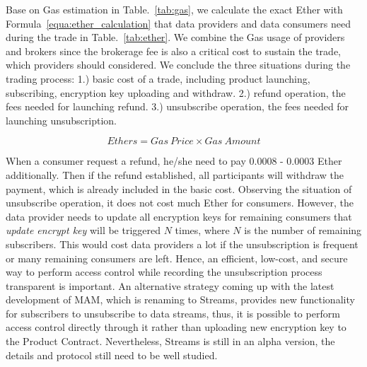 \documentclass[conference]{IEEEtran}
\begin{document}
Base on Gas estimation in Table.~\ref{tab:gas}, we calculate the exact Ether with Formula~\ref{equa:ether_calculation} that data providers and data consumers need during the trade in Table.~\ref{tab:ether}. We combine the Gas usage of providers and brokers since the brokerage fee is also a critical cost to sustain the trade, which providers should considered. We conclude the three situations during the trading process: 1.) basic cost of a trade, including product launching, subscribing, encryption key uploading and withdraw. 2.) refund operation, the fees needed for launching refund. 3.) unsubscribe operation, the fees needed for launching unsubscription.

\begin{equation}
\label{equa:ether_calculation}
Ethers = Gas \ Price \times Gas \ Amount
\end{equation}

When a consumer request a refund, he/she need to pay 0.0008 - 0.0003 Ether additionally. Then if the refund established, all participants will withdraw the payment, which is already included in the basic cost. Observing the situation of unsubscribe operation, it does not cost much Ether for consumers. However, the data provider needs to update all encryption keys for remaining consumers that \textit{update encrypt key} will be triggered $N$ times, where $N$ is the number of remaining subscribers. This would cost data providers a lot if the unsubscription is frequent or many remaining consumers are left. Hence, an efficient, low-cost, and secure way to perform access control while recording the unsubscription process transparent is important. An alternative strategy coming up with the latest development of MAM, which is renaming to Streams\cite{stream}, provides new functionality for subscribers to unsubscribe to data streams, thus, it is possible to perform access control directly through it rather than uploading new encryption key to the Product Contract. Nevertheless, Streams is still in an alpha version, the details and protocol still need to be well studied.
\end{document}
